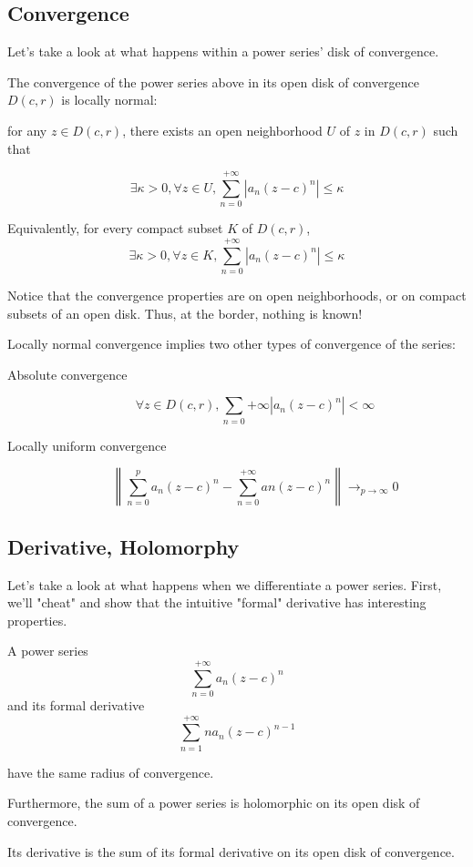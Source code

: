 \subsection{Convergence}
Let's take a look at what happens within a power series' disk of convergence.

\begin{thm*}
    The convergence of the power series above in its open disk of convergence $D(c, r)$ is locally normal:
    
    for any $z\in D(c,r)$, there exists an open neighborhood $U$ of $z$ in $D(c, r)$ such that

    $$\exists \kappa > 0, \forall z \in U, \sum_{n=0}^{+\infty}|a_n(z-c)^n| \leq \kappa$$


    Equivalently, for every compact subset $K$ of $D(c,r)$,
    $$\exists \kappa > 0, \forall z \in K, \sum_{n=0}^{+\infty}|a_n(z-c)^n| \leq \kappa$$

\end{thm*}

\begin{note}
    Notice that the convergence properties are on open neighborhoods, or on compact subsets of an open disk. Thus, at the border, nothing is known!
\end{note}
    
\begin{thm*}
    Locally normal convergence implies two other types of convergence of the series:

    \begin{description}
        \item[Absolute convergence] 
        $$\forall z \in D(c,r), \sum_{n=0}{+\infty}|a_n(z-c)^n| < \infty$$
        \item[Locally uniform convergence] 
            $$\left\|\sum_{n=0}^{p}a_n(z-c)^n - \sum_{n=0}^{+\infty}an(z-c)^n\right\|\rightarrow_{p\rightarrow\infty} 0$$
    \end{description}
\end{thm*}

\subsection{Derivative, Holomorphy}

Let's take a look at what happens when we differentiate a power series. First, we'll "cheat" and show that the intuitive "formal" derivative has interesting properties.
\begin{thm*}
    A power series 
$$\sum_{n=0}^{+\infty}a_n(z-c)^n$$
and its formal derivative 
$$\sum_{n=1}^{+\infty}na_n(z-c)^{n-1}$$

have the same radius of convergence.

Furthermore, the sum of a power series is holomorphic on its open disk of convergence.

Its derivative is the sum of its formal derivative on its open disk of convergence.

\end{thm*}

